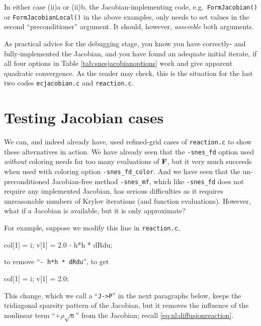 In either case (ii)a or (ii)b, the Jacobian-implementing code, e.g.~\texttt{FormJacobian()} or \texttt{FormJacobianLocal()} in the above examples, only needs to set values in the second ``preconditioner'' \pMat argument.  It should, however, \emph{assemble} both \pMat arguments.

As practical advice for the debugging stage, you know you have correctly- and fully-implemented the Jacobian, and you have found an adequate initial iterate, if all four options in Table \ref{tab:snesjacobianoptions} work and give apparent quadratic convergence.  As the reader may check, this is the situation for the last two codes \texttt{ecjacobian.c} and \texttt{reaction.c}.


\section{Testing Jacobian cases} \label{sec:jacobiantesting}

We can, and indeed already have, used refined-grid cases of \texttt{reaction.c} to show these alternatives in action.  We have already seen that the \texttt{-snes\_fd} option used \emph{without} coloring needs far too many evaluations of $\mathbf{F}$, but it very much succeeds when used with coloring option \texttt{-snes\_fd\_color}.  And we have seen that the un-preconditioned Jacobian-free method \texttt{-snes\_mf}, which like \texttt{-snes\_fd} does not require any implemented Jacobian, has serious difficulties as it requires unreasonable numbers of Krylov iterations (and function evaluations).  However, what if a Jacobian is available, but it is only approximate?

For example, suppose we modify this line in \texttt{reaction.c},
\begin{code}
    col[1] = i;    v[1] = 2.0 - h*h * dRdu;
\end{code}
to remove ``\texttt{- h*h * dRdu}'', to get
\begin{code}
    col[1] = i;    v[1] = 2.0;
\end{code}
This change, which we call a ``\texttt{J->P}'' in the next paragraphs below, keeps the tridiagonal sparsity pattern of the Jacobian, but it removes the influence of the nonlinear term ``$+\rho \sqrt{u}$'' from the Jacobian; recall \eqref{eq:nl:diffusionreaction}.

